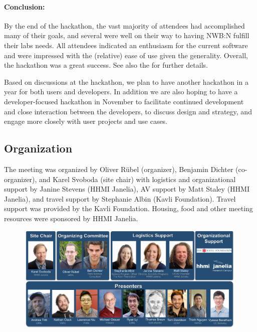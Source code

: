 \documentclass{article}
\begin{document}
\vspace{-0.2cm}
\paragraph{Conclusion:}
By the end of the hackathon, the vast majority of attendees had accomplished many of their goals, and several were well on their way to having NWB:N fulfill their labs needs. All attendees indicated an enthusiasm for the current software and were impressed with the (relative) ease of use given the generality. Overall, the hackathon was a great success. See also the  for further details.

Based on discussions at the hackathon, we plan to have another hackathon in a year for both users and developers. In addition we are also hoping to have a developer-focused hackathon in November to facilitate continued development and close interaction between the developers, to discuss design and strategy, and engage more closely with user projects and use cases. 

\subsection{Organization}

The meeting was organized by Oliver R\"ubel (organizer), Benjamin Dichter (co-organizer), and Karel Svoboda (site chair) with logistics and organizational support by Janine Stevens (HHMI Janelia), AV support by Matt Staley (HHMI Janelia), and travel support by Stephanie Albin (Kavli Foundation). Travel support was provided by the Kavli Foundation.  Housing, food and other meeting resources were sponsored by HHMI Janelia. 

\begin{figure}[h!]
\includegraphics[width=15.5cm]{figures/organization_and_presenters.pdf}
\end{figure}
\end{document}
